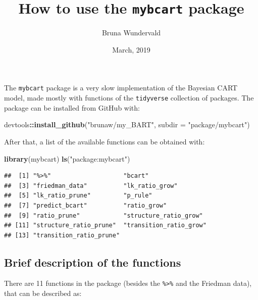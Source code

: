\documentclass[]{article}
\title{How to use the \texttt{mybcart} package}
\author{Bruna Wundervald}
\date{March, 2019}
\newenvironment{Shaded}{\begin{snugshade}}{\end{snugshade}}
\newcommand{\DataTypeTok}[1]{\textcolor[rgb]{0.13,0.29,0.53}{#1}}
\newcommand{\KeywordTok}[1]{\textcolor[rgb]{0.13,0.29,0.53}{\textbf{#1}}}
\newcommand{\NormalTok}[1]{#1}
\newcommand{\OperatorTok}[1]{\textcolor[rgb]{0.81,0.36,0.00}{\textbf{#1}}}
\newcommand{\StringTok}[1]{\textcolor[rgb]{0.31,0.60,0.02}{#1}}
\begin{document}
\maketitle

The \texttt{mybcart} package is a very slow implementation of the
Bayesian CART model, made mostly with functions of the
\texttt{tidyverse} collection of packages. The package can be installed
from GitHub with:

\begin{Shaded}
\begin{Highlighting}[]
\NormalTok{devtools}\OperatorTok{::}\KeywordTok{install_github}\NormalTok{(}\StringTok{"brunaw/my_BART"}\NormalTok{, }\DataTypeTok{subdir =} \StringTok{"package/mybcart"}\NormalTok{)}
\end{Highlighting}
\end{Shaded}

After that, a list of the available functions can be obtained with:

\begin{Shaded}
\begin{Highlighting}[]
\KeywordTok{library}\NormalTok{(mybcart)}
\KeywordTok{ls}\NormalTok{(}\StringTok{"package:mybcart"}\NormalTok{)}
\end{Highlighting}
\end{Shaded}

\begin{verbatim}
##  [1] "%>%"                    "bcart"                 
##  [3] "friedman_data"          "lk_ratio_grow"         
##  [5] "lk_ratio_prune"         "p_rule"                
##  [7] "predict_bcart"          "ratio_grow"            
##  [9] "ratio_prune"            "structure_ratio_grow"  
## [11] "structure_ratio_prune"  "transition_ratio_grow" 
## [13] "transition_ratio_prune"
\end{verbatim}

\hypertarget{brief-description-of-the-functions}{%
\subsection{Brief description of the
functions}\label{brief-description-of-the-functions}}

There are 11 functions in the package (besides the
\texttt{\%\textgreater{}\%} and the Friedman data), that can be
described as:
\end{document}
